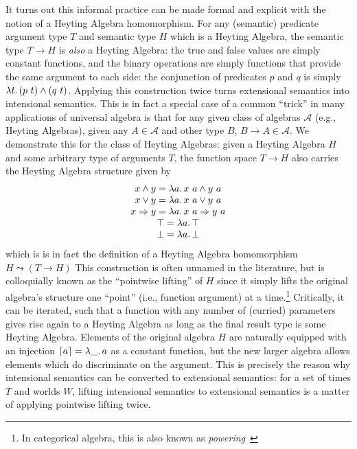\documentclass[11pt,a4paper,acceptedWithA]{article}
\begin{document}
It turns out this informal practice can be made formal and explicit with the notion of a Heyting Algebra homomorphism.
For any (semantic) predicate argument type $T$ and semantic type $H$ which is a Heyting Algebra, the semantic type $T\rightarrow H$ is \emph{also} a Heyting Algebra: the true and false values are simply constant functions, and the binary operations are simply functions that provide the same argument to each side: the conjunction of predicates $p$ and $q$ is simply $\lambda t\ldotp (p~t)\wedge(q~t)$. Applying this construction twice turns extensional semantics into intensional semantics.
This is in fact a special case of a common ``trick'' in many applications of universal algebra is that for any given class of algebras $\mathcal{A}$ (e.g., Heyting Algebras), given any $A\in\mathcal{A}$ and other type $B$, $B\rightarrow A\in\mathcal{A}$. We demonstrate this for the class of Heyting Algebras: given a Heyting Algebra $H$ and some arbitrary type of arguments $T$, the function space $T\rightarrow H$ also carries the Heyting Algebra structure given by
\[
\begin{array}{c}
    x\land y = \lambda a\ldotp x~a\land y~a\\
    x\vee y = \lambda a\ldotp x~a\vee y~a\\
    x\Rightarrow y = \lambda a\ldotp x~a\Rightarrow y~a\\
    \top = \lambda a\ldotp \top\\
    \bot = \lambda a\ldotp \bot\\
\end{array}
\]
which is is in fact the definition of a Heyting Algebra homomorphism $H\leadsto(T\rightarrow H)$
This construction is often unnamed in the literature, but is colloquially known as the ``pointwise lifting'' of $H$ since it simply lifts the original algebra's structure one ``point'' (i.e., function argument) at a time.\footnote{In categorical algebra, this is also known as \emph{powering}~} Critically, it can be iterated, such that a function with any number of (curried) parameters gives rise again to a Heyting Algebra as long as the final result type is some Heyting Algebra.
Elements of the original algebra $H$ are naturally equipped with an injection $\lceil a\rceil = \lambda\_\ldotp a$ as a constant function, but the new larger algebra allows elements which do discriminate on the argument.
This is precisely the reason why intensional semantics can be converted to extensional semantics: for a set of times $T$ and worlds $W$, lifting intensional semantics to extensional semantics is a matter of applying pointwise lifting twice.
\end{document}
